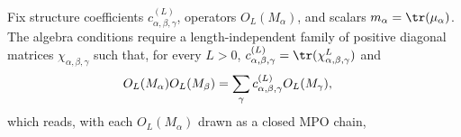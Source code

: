 \begin{definition}%
    \label{def:mpdo_bnt_algebra_clause}
    \leanok
    Fix structure coefficients $c^{(L)}_{\alpha,\beta,\gamma}$,
    operators $O_L(M_\alpha)$, and scalars $m_\alpha=\tr(\mu_\alpha)$.
    The algebra conditions require a length-independent family of
    positive diagonal matrices $\chi_{\alpha,\beta,\gamma}$ such that, for
    every $L>0$,
    $c^{(L)}_{\alpha,\beta,\gamma}
        =\tr(\chi_{\alpha,\beta,\gamma}^{L})$ and
    \begin{align}
        O_L(M_\alpha)O_L(M_\beta)
         & =\sum_\gamma c^{(L)}_{\alpha,\beta,\gamma}O_L(M_\gamma),
        \notag
    \end{align}
    which reads, with each $O_L(M_\alpha)$ drawn as a closed MPO chain,
    \begin{center}
        \tenkzkernel
        \begin{tenkz}[rows={op,op}, cols=4, west=trace, east=trace,
                bonds=none]

\end{tenkz}
\end{center}
\end{definition}
